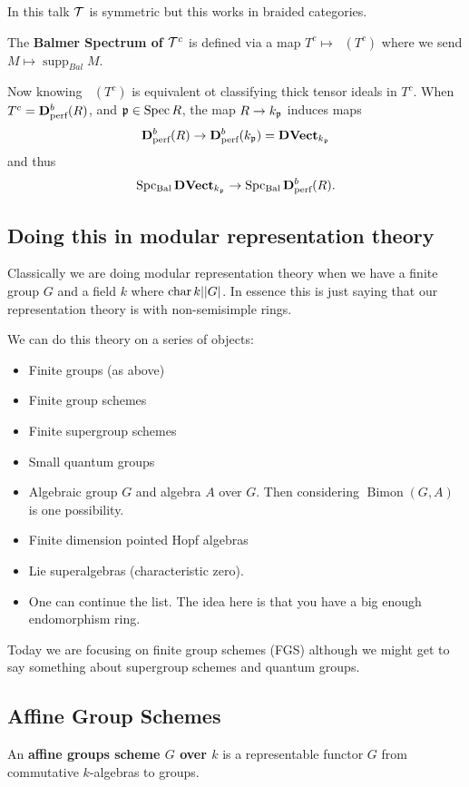 \documentclass[12pt]{article}
\newcommand{\p}{\frakp}
\DeclareMathOperator{\Spec}{Spec}
\DeclareMathOperator{\supp}{supp}
\DeclareMathOperator{\SpcBal}{Spc_{Bal}}
\begin{document}
\begin{rmk}
	In this talk $\mathcal{T}$ is symmetric but this works in braided categories.
\end{rmk}
\begin{defn}
	The \textbf{Balmer Spectrum of $\mathcal{T}^c$} is defined via a map $T^c\mapsto \SpcBal(T^c)$ where we send 
	$M\mapsto\supp_{Bal}M$.
\end{defn}

Now knowing $\SpcBal(T^c)$ is equivalent ot classifying thick tensor ideals in $T^c$. When $T^c=\mathbf{D}^b_{\text{perf}}(R)$, 
and $\p\in\Spec R$, the map $R\to k_\p$ induces maps 
\[\Dbperf(R)\to \Dbperf(k_\p)=\D\mathbf{Vect}_{k_\p}\]
and thus 
\[\SpcBal \D\mathbf{Vect}_{k_\p}\to \SpcBal\Dbperf(R).\]

\subsection{Doing this in modular representation theory}
Classically we are doing modular representation theory when we have a finite group $G$ and a field $k$ where $\operatorname{char} k| |G|$.
In essence this is just saying that our representation theory is with non-semisimple rings.

We can do this theory on a series of objects:
\begin{itemize}
	\item Finite groups (as above)
	\item Finite group schemes
	\item Finite supergroup schemes
	\item Small quantum groups
	\item Algebraic group $G$ and algebra $A$ over $G$. Then considering $\operatorname{Bimon}(G,A)$ is one possibility.
	\item Finite dimension pointed Hopf algebras
	\item Lie superalgebras (characteristic zero).
	\item One can continue the list. The idea here is that you have a big enough endomorphism ring.
\end{itemize}

Today we are focusing on finite group schemes (FGS) although we might get to say something about supergroup schemes and quantum groups.

\subsection{Affine Group Schemes}
\begin{defn}
	An \textbf{affine groups scheme $G$ over $k$} is a representable functor $G$ from commutative $k$-algebras to groups.
\end{defn}
\end{document}
